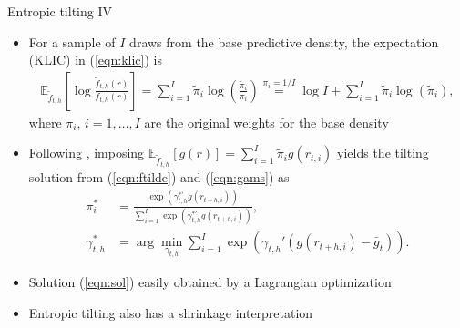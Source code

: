 \documentclass[9pt,xcolor=x11names,compress]{beamer}
\let\natbibcitep\citep
\renewcommand\citep{\bibpunct{(}{)}{;}{a}{,}{;}\natbibcitep}
\let\oldcite=\cite
\renewcommand{\cite}[1]{\textcolor{dblue}{\oldcite{#1}}}
\theoremstyle{standard}
\theoremstyle{notes}
\begin{document}
\begin{frame}{Entropic tilting IV}
	\begin{itemize}
		\item For a sample of $I$ draws from the base predictive density, the expectation (KLIC) in (\ref{eqn:klic}) is 
		\begin{align}
		\mathbb{E}_{\tilde{f}_{t,h}}\left[\log\frac{\tilde{f}_{t,h}(r)}{f_{t,h}(r)}\right]=\sum_{i=1}^I\tilde{\pi}_i\log\left(\frac{\tilde{\pi}_i}{\pi_i}\right)\stackrel{\pi_i=1/I}{=}\log{I}+\sum_{i=1}^I\tilde{\pi}_i\log\left(\tilde{\pi}_i\right),
		\end{align}
		where $\pi_i$, $i=1,\ldots,I$ are the original weights for the base density 
		\item Following \cite{robertson2005}, imposing $\mathbb{E}_{\tilde{f}_{t,h}}\left[g(r)\right]=\sum_{i=1}^I\tilde{\pi}_ig(r_{t,i})$ yields the tilting solution from (\ref{eqn:ftilde}) and (\ref{eqn:gams}) as
		\begin{align}\label{eqn:sol}
		\pi_i^*&=\frac{\exp\left(\gamma_{t,h}^{*'}g(r_{t+h,i})\right)}{\sum_{i=1}^I\exp\left(\gamma_{t,h}^{*'}g(r_{t+h,i})\right)},\\\label{eqn:gamma}
		\gamma_{t,h}^*&=\arg\min_{\gamma_{t,h}}\sum_{i=1}^I\exp\left(\gamma_{t,h}'(g(r_{t+h,i})-\bar{g}_t)\right).
		\end{align}
		\item Solution (\ref{eqn:sol}) easily obtained by a Lagrangian optimization
		\item Entropic tilting also has a shrinkage interpretation
		\end{itemize}
\end{frame}
%
%
\end{document}
